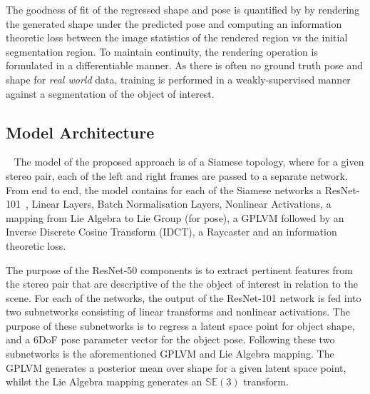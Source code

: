 The goodness of fit of the regressed shape and pose is quantified by by rendering the generated shape 
under the predicted pose and computing an information theoretic loss between the image statistics of 
the rendered region vs the initial segmentation region. To maintain continuity, the rendering operation is 
formulated in a differentiable manner. As there is often no ground truth pose and shape for \textit{real world} 
data, training is performed in a weakly-supervised manner against a segmentation of the object of interest.

\subsection{Model Architecture}
~\label{subsec:spp_network_architecture}
The model of the proposed approach is of a Siamese topology, where for a given stereo 
pair, each of the left and right frames are passed to a separate network. From end to 
end, the model contains for each of the Siamese networks a ResNet-101~\cite{He2015}, 
Linear Layers, Batch Normalisation Layers, Nonlinear Activations, a mapping from Lie Algebra to 
Lie Group (for pose), a GPLVM followed by an Inverse Discrete Cosine Transform (IDCT), a Raycaster and 
an information theoretic loss. 

The purpose of the ResNet-50 components is to extract pertinent features from the stereo 
pair that are descriptive of the the object of interest in relation to the scene. For each 
of the networks, the output of the ResNet-101 network is fed into two subnetworks consisting 
of linear transforms and nonlinear activations. The purpose of these subnetworks is to regress 
a latent space point for object shape, and a 6DoF pose parameter vector for the object pose. 
Following these two subnetworks is the aforementioned GPLVM and Lie Algebra mapping. The 
GPLVM generates a posterior mean over shape for a given latent space point, whilst the 
Lie Algebra mapping generates an \( \mathbb{SE}(3) \) transform. 

